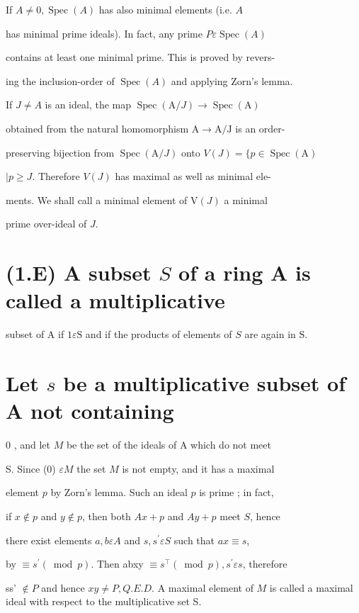If $A \neq 0, \operatorname{Spec}(A)$ has also minimal elements (i.e. $A$

has minimal prime ideals). In fact, any prime $P \varepsilon \operatorname{Spec}(A)$

contains at least one minimal prime. This is proved by revers-

ing the inclusion-order of $\operatorname{Spec}(A)$ and applying Zorn's lemma.

If $J \neq A$ is an ideal, the map $\operatorname{Spec}(\mathrm{A} / J) \rightarrow \operatorname{Spec}(\mathrm{A})$

obtained from the natural homomorphism $\mathrm{A} \rightarrow \mathrm{A} / \mathrm{J}$ is an order-

preserving bijection from $\operatorname{Spec}(\mathrm{A} / J)$ onto $V(J)=\{p \in \operatorname{Spec}(\mathrm{A})$

$\mid p \geq J$. Therefore $V(J)$ has maximal as well as minimal ele-

ments. We shall call a minimal element of $\mathrm{V}(J)$ a minimal

prime over-ideal of $J .$

\section{(1.E) A subset $S$ of a ring A is called a multiplicative}
subset of A if $1 \varepsilon \mathrm{S}$ and if the products of elements of $S$ are again in $\mathrm{S}$.

\section{Let $s$ be a multiplicative subset of A not containing}
0 , and let $M$ be the set of the ideals of A which do not meet

S. Since (0) $\varepsilon M$ the set $M$ is not empty, and it has a maximal

element $p$ by Zorn's lemma. Such an ideal $p$ is prime ; in fact,

if $x \notin p$ and $y \notin p$, then both $A x+p$ and $A y+p$ meet $S$, hence

there exist elements $a, b \varepsilon A$ and $s, s^{\prime} \varepsilon S$ such that $a x \equiv s$,

by $\equiv s^{\prime}(\bmod p)$. Then abxy $\equiv s^{\top}(\bmod p), s^{\prime} \varepsilon s$, therefore

ss' $\notin P$ and hence $x y \neq P, Q . E . D$. A maximal element of $M$ is called a maximal ideal with respect to the multiplicative set S.

